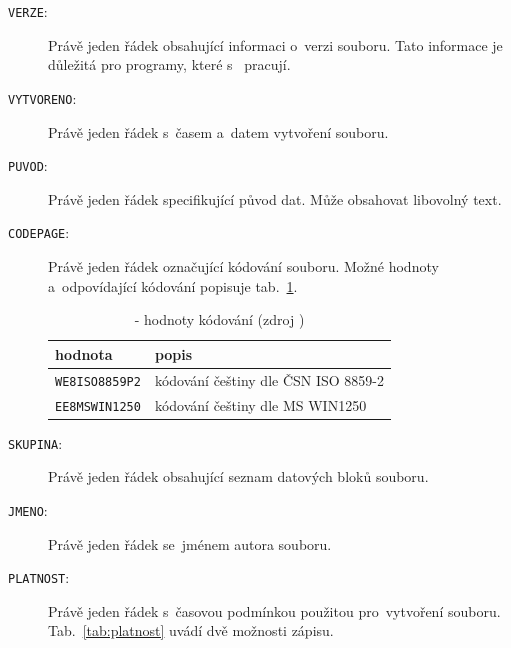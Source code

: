 \begin{description}
	\item[\texttt{VERZE}:] Právě jeden řádek obsahující informaci o~verzi  souboru. Tato informace je důležitá pro programy, které s~ pracují.
	\item[\texttt{VYTVORENO}:] Právě jeden řádek s~časem a~datem vytvoření souboru.
	\item[\texttt{PUVOD}:] Právě jeden řádek specifikující původ dat. Může obsahovat libovolný text.
	\item[\texttt{CODEPAGE}:] Právě jeden řádek označující kódování souboru. Možné hodnoty a~odpo\-vídající kódování popisuje tab.~\ref{tab:kodovani}.

    \begin{table}[H]
        \begin{tabular}{|l|l|}
            \hline
             hodnota & popis \\
            \hline
            \hline
             \texttt{WE8ISO8859P2} & kódování češtiny dle ČSN ISO 8859-2 \\ \hline
             \texttt{EE8MSWIN1250} & kódování češtiny dle MS WIN1250 \\
             \hline
        \end{tabular}
        \centering
        \caption[ - hodnoty kódování]{ - hodnoty kódování (zdroj \citep{struktura_vfk})}
        \label{tab:kodovani}
    \end{table}

	\item[\texttt{SKUPINA}:] Právě jeden řádek obsahující seznam datových bloků souboru.
	\item[\texttt{JMENO}:] Právě jeden řádek se~jménem autora souboru.
	\item[\texttt{PLATNOST}:] Právě jeden řádek s~časovou podmínkou použitou pro~vytvoření souboru. Tab.~\ref{tab:platnost} uvádí dvě možnosti zápisu.


\end{description}
